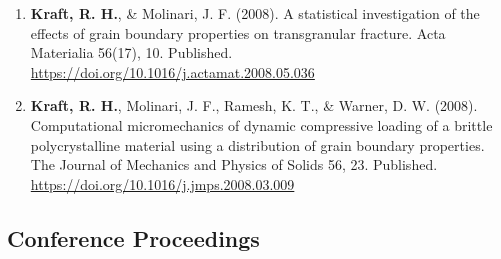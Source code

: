 \documentclass[a4paper,10pt]{article}
\begin{document}
\begin{enumerate}
 \item	\textbf{\textbf{Kraft,} R. H.}, \&
 Molinari, J. F. (2008). A statistical investigation of the effects of grain boundary properties on transgranular fracture. Acta Materialia 56(17), 10. Published. \url{https://doi.org/10.1016/j.actamat.2008.05.036}
 \item	\textbf{\textbf{Kraft,} R. H.}, Molinari, J. F., Ramesh, K. T., \&
 Warner, D. W. (2008). Computational micromechanics of dynamic compressive loading of a brittle polycrystalline material using a distribution of grain boundary properties. The Journal of Mechanics and Physics of Solids 56, 23. Published. \url{https://doi.org/10.1016/j.jmps.2008.03.009}

    \end{enumerate}
    
    \subsection*{Conference Proceedings}
\end{document}
